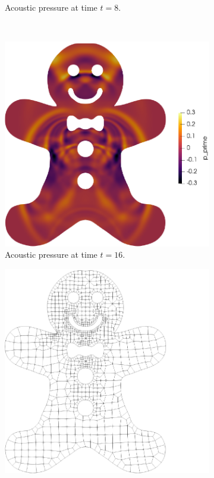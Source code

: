 \documentclass[hidelinks]{juliacon} %
\begin{document}
\begin{figure}[!h]
\begin{subfigure}{0.46\linewidth}
    \caption{Acoustic pressure at time $t = 8$.}
  \end{subfigure}%
  \\
  \begin{subfigure}{0.46\linewidth}
    \includegraphics[width=\textwidth]{../figures/ginger_time_16}
    \caption{Acoustic pressure at time $t = 16$.}
  \end{subfigure}%
  \hspace*{\fill}
  \begin{subfigure}{0.46\linewidth}
    \includegraphics[width=\textwidth]{../figures/ginger_mesh}

\end{subfigure}
\end{figure}
\end{document}
